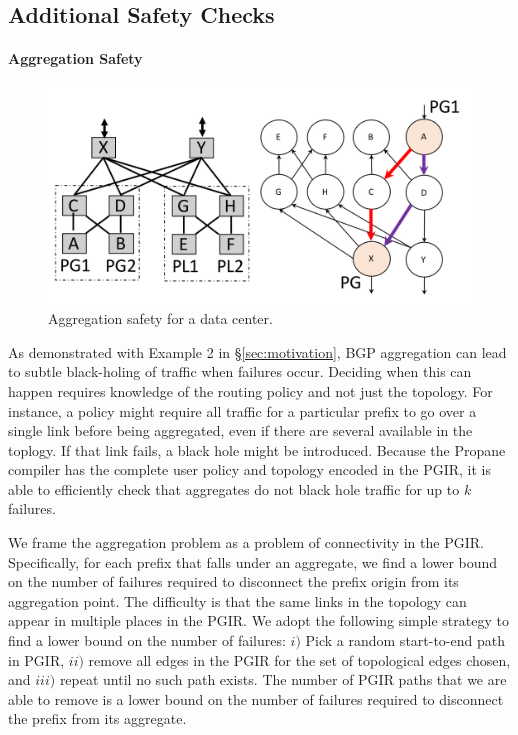 \documentclass[10pt]{sigalternate052015}
\newcommand{\sysname}{{\small \sf Propane}\xspace}
\newcommand{\para}[1]{\paragraph*{\textbf{#1}}}
\begin{document}
\subsection{Additional Safety Checks}

\para{Aggregation Safety}
\label{sec:agg-safety}

\begin{figure}[t!]
  \centering
  \includegraphics[width=\columnwidth]{figures/aggregation}
  \caption{Aggregation safety for a data center.}
  \label{fig:aggregation-safety}
  \vspace{-1em}
\end{figure}

As demonstrated with Example 2 in \S\ref{sec:motivation}, BGP aggregation can lead to subtle black-holing of traffic when failures occur. Deciding when this can happen requires knowledge of the routing policy and not just the topology. For instance, a policy might require all traffic for a particular prefix to go over a single link before being aggregated, even if there are several available in the toplogy. If that link fails, a black hole might be introduced. 
%
Because the \sysname compiler has the complete user policy and topology encoded in the PGIR, it is able to efficiently check that aggregates do not black hole traffic for up to $k$ failures.

We frame the aggregation problem as a problem of connectivity in the PGIR. Specifically, for each prefix that falls under an aggregate, we find a lower bound on the number of failures required to disconnect the prefix origin from its aggregation point. The difficulty is that the same links in the topology can appear in multiple places in the PGIR. 
%
%
We adopt the following simple strategy to find a lower bound on 
the number of failures: $i)$ Pick a random start-to-end path in PGIR, $ii)$ remove all edges in the PGIR for the set of topological edges chosen, and $iii)$ repeat until no such path exists.
The number of PGIR paths that we are able to remove is a lower bound on the number of failures required to disconnect the prefix from its aggregate. 
\end{document}
